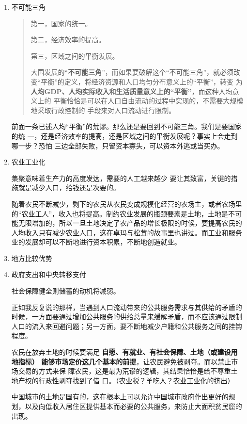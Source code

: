 \begin{enumerate}
\item 不可能三角

  \begin{quotation}

    第一，国家的统一。

    第二，经济效率的提高。

    第三，区域之间的平衡发展。

    大国发展的“\textbf{不可能三角}”，而如果要破解这个“不可能三角”，就必须改
    变“平衡”的定义，将经济资源和人口均匀分布意义上的“平衡”，转变
    为\textbf{人均GDP、人均实际收入和生活质量意义上的“平衡”}，而这种人均意义上的
    平衡恰恰是可以在人口自由流动的过程中实现的，不需要大规模地采取行政控制的
    手段来对人口流动进行限制。
  \end{quotation}
  前面一条已述人均“平衡”的荒谬。那么还是要回到不可能三角。我们是要国家的统
  一，还是经济效率的提高，还是区域之间的平衡发展呢？事实上会走到哪一步？恐怕
  三边全部失败，只留资本寡头，可以资本外逃或当买办。

\item 农业工业化

集聚意味着生产力的高度发达，需要的人工越来越少
要让其致富，关键的措施就是减少人口，给钱还是次要的。


随着农民不断减少，剩下的农民从农民变成规模化经营的农场主，或者农场里的“农业工人”，收入也将提高。制约农业发展的瓶颈要素是土地，土地是不可能无限增加的，所以一旦土地决定了农产品的增长极限的时候，要提高农民的人均收入只有减少农业人口，这在卓玛与松茸的故事里也讲过。而工业和服务业的发展却可以不断地进行资本积累，不断地创造就业。

\item 地方比较优势

\item 政府支出和中央转移支付

社会保障健全则储蓄的动机将减弱。

正如我反复说的那样，当遇到人口流动带来的公共服务需求与其供给的矛盾的时候，一方面要通过增加公共服务的供给总量来缓解矛盾，而不应该通过限制人口的流入来回避问题；另一方面，要不断地减少户籍和公共服务之间的挂钩程度。

农民在放弃土地的时候要满足\textbf{ 自愿、有就业、有社会保障、土地（或建设用地指标）
  能够市场定价这几个基本的前提}，让农民避免被剥夺。而以禁止市场交易的方式来保
障农民，这是最为荒谬的逻辑，其结果恰恰是给不尊重土地产权的行政性剥夺找到了借
口。（农业税？羊吃人？农业工业化的挤出）

中国城市的土地是国有的，这在根本上可以允许中国城市政府作出更好的规划，以及向低收入居住区提供基本而必要的公共服务，来防止大面积贫民窟的出现。


\end{enumerate}
